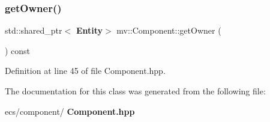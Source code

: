 \subsubsection{get\+Owner()}
{\footnotesize\ttfamily std\+::shared\+\_\+ptr$<$\textbf{ Entity}$>$ mv\+::\+Component\+::get\+Owner (\begin{DoxyParamCaption}{ }\end{DoxyParamCaption}) const\hspace{0.3cm}{\ttfamily [inline]}}



Definition at line 45 of file Component.\+hpp.



The documentation for this class was generated from the following file\+:\begin{DoxyCompactItemize}
\item 
ecs/component/\textbf{ Component.\+hpp}\end{DoxyCompactItemize}
